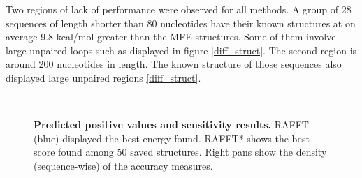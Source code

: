 \documentclass[a4paper,12pt]{article}
\begin{document}
Two regions of lack of performance were observed for all methods. A group of 28
sequences of length shorter than 80 nucleotides have their known structures at
on average 9.8 kcal/mol greater than the MFE structures. Some of them involve
large unpaired loops such as displayed in figure \ref{diff_struct}. The second
region is around 200 nucleotides in length. The known structure of those
sequences also displayed large unpaired regions \ref{diff_struct}.

\begin{figure}[!ht]
  \centering
  \\
  \caption{\textbf{Predicted positive values and sensitivity
      results\label{perf_fig}.} RAFFT (blue) displayed the best energy found.
    RAFFT* shows the best score found among 50 saved structures. Right pans show
    the density (sequence-wise) of the accuracy measures.}
\end{figure}
\end{document}
